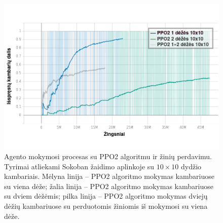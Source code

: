 \documentclass{VUMIFPSbakalaurinis}
\begin{document}
{\begin{figure}[H]
		\label{img:acer_completions}
	\end{figure}
	\begin{figure}[H]
		\centering
		\includegraphics[scale=0.75]{img/graphs/ppo2_completions}
		\caption{Agento mokymosi procesas su PPO2 algoritmu ir žinių perdavimu. Tyrimai atliekami Sokoban žaidimo aplinkoje su \(10 \times 10\) dydžio kambariais. Mėlyna linija -- PPO2 algoritmo mokymas kambariuose su viena dėže; žalia linija -- PPO2 algoritmo mokymas kambariuose su dviem dėžėmis; pilka linija -- PPO2 algoritmo mokymas dviejų dėžių kambariuose su perduotomis žiniomis iš mokymosi su viena dėže.}
		\label{img:ppo2_completions}
	\end{figure}
}
\end{document}
